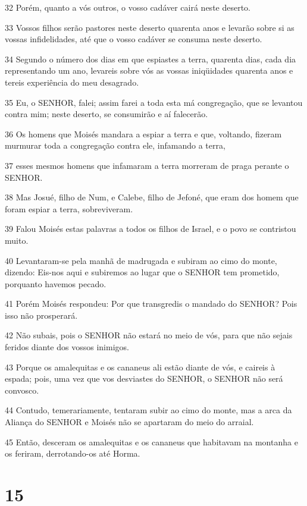\par 32 Porém, quanto a vós outros, o vosso cadáver cairá neste deserto.
\par 33 Vossos filhos serão pastores neste deserto quarenta anos e levarão sobre si as vossas infidelidades, até que o vosso cadáver se consuma neste deserto.
\par 34 Segundo o número dos dias em que espiastes a terra, quarenta dias, cada dia representando um ano, levareis sobre vós as vossas iniqüidades quarenta anos e tereis experiência do meu desagrado.
\par 35 Eu, o SENHOR, falei; assim farei a toda esta má congregação, que se levantou contra mim; neste deserto, se consumirão e aí falecerão.
\par 36 Os homens que Moisés mandara a espiar a terra e que, voltando, fizeram murmurar toda a congregação contra ele, infamando a terra,
\par 37 esses mesmos homens que infamaram a terra morreram de praga perante o SENHOR.
\par 38 Mas Josué, filho de Num, e Calebe, filho de Jefoné, que eram dos homem que foram espiar a terra, sobreviveram.
\par 39 Falou Moisés estas palavras a todos os filhos de Israel, e o povo se contristou muito.
\par 40 Levantaram-se pela manhã de madrugada e subiram ao cimo do monte, dizendo: Eis-nos aqui e subiremos ao lugar que o SENHOR tem prometido, porquanto havemos pecado.
\par 41 Porém Moisés respondeu: Por que transgredis o mandado do SENHOR? Pois isso não prosperará.
\par 42 Não subais, pois o SENHOR não estará no meio de vós, para que não sejais feridos diante dos vossos inimigos.
\par 43 Porque os amalequitas e os cananeus ali estão diante de vós, e caireis à espada; pois, uma vez que vos desviastes do SENHOR, o SENHOR não será convosco.
\par 44 Contudo, temerariamente, tentaram subir ao cimo do monte, mas a arca da Aliança do SENHOR e Moisés não se apartaram do meio do arraial.
\par 45 Então, desceram os amalequitas e os cananeus que habitavam na montanha e os feriram, derrotando-os até Horma.

\chapter{15}

